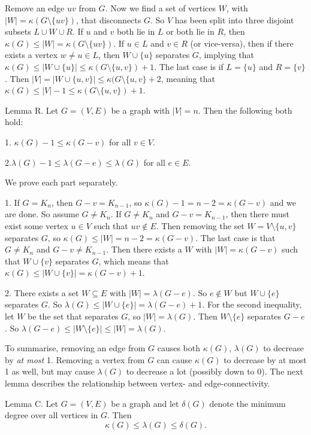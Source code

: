 \proof Remove an edge $uv$ from $G$. Now we find a set of vertices $W$, with $|W| = \kappa(G\setminus\{uv\})$, that disconnects $G$. So $V$ has been split into three disjoint subsets $L\cup W\cup R$. If $u$ and $v$ both lie in $L$ or both lie in $R$, then $\kappa(G) \leq |W| = \kappa(G\setminus\{uv\})$. If $u\in L$ and $v\in R$ (or vice-versa), then if there exists a vertex $w\neq u\in L$, then $W\cup \{u\}$ separates $G$, implying that $\kappa(G)\leq |W\cup \{u\}|\leq \kappa(G\setminus\{u,v\}) + 1$. The last case is if $L = \{u\}$ and $R=\{v\}$. Then $|V| = |W\cup\{u,v\}|\leq \kappa(G\setminus\{u,v\} + 2$, meaning that $\kappa(G)\leq |V|-1 \leq \kappa(G\setminus\{u,v\})+1$. \slug

\proclaim Lemma R. Let $G=(V,E)$ be a graph with $|V|=n$. Then the following both hold:
\medskip
\item {1.} $\kappa(G) - 1 \leq \kappa(G-v)$ for all $v\in V$.
\smallskip
\item {2.}$\lambda(G) - 1 \leq \lambda(G-e)\leq \lambda(G)$ for all $e\in E$.
\medskip

\proof We prove each part separately.
\medskip
\item {1.} If $G = K_n$, then $G-v=K_{n-1}$, so $\kappa(G) - 1 = n-2 = \kappa(G-v)$ and we are done. So assume $G\neq K_n$. If $G\neq K_n$ and $G-v = K_{n-1}$, then there must exist some vertex $u\in V$ such that $uv\notin E$. Then removing the set $W = V\setminus\{u,v\}$ separates $G$, so $\kappa(G) \leq |W| = n-2 = \kappa(G-v)$. The last case is that $G\neq K_n$ and $G-v \neq K_{n-1}$. Then there exists a $W$ with $|W|=\kappa(G-v)$ such that $W\cup \{v\}$ separates $G$, which means that $\kappa(G) \leq |W\cup\{v\}| = \kappa(G-v)+1$.
\smallskip
\item {2.} There exists a set $W\subseteq E$ with $|W| = \lambda(G-e)$. So $e\notin W$ but $W\cup\{e\}$ separates $G$. So $\lambda(G) \leq |W\cup\{e\}| = \lambda(G-e) + 1$. For the second inequality, let $W$ be the set that separates $G$, so $|W|=\lambda(G)$. Then $W\setminus\{e\}$ separates $G-e$. So $\lambda(G-e) \leq |W\setminus\{e\}|\leq |W|=\lambda(G)$.\slug

To summarise, removing an edge from $G$ causes both $\kappa(G)$, $\lambda(G)$ to decrease by {\it at most} 1. Removing a vertex from $G$ can cause $\kappa(G)$ to decrease by at most 1 as well, but may cause $\lambda(G)$ to decrease a lot (possibly down to 0). The next lemma describes the relationship between vertex- and edge-connectivity.

\proclaim Lemma C. Let $G=(V,E)$ be a graph and let $\delta(G)$ denote the minimum degree over all vertices in $G$. Then
$$ \kappa(G) \leq \lambda(G) \leq \delta(G).$$

